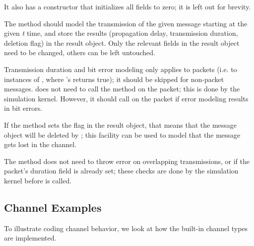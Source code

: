 It also has a constructor that initializes all fields to zero; it is left
out for brevity.

The method should model the transmission of the given message starting at
the given \textit{t} time, and store the results (propagation delay,
transmission duration, deletion flag) in the result object. Only the
relevant fields in the result object need to be changed, others can be left
untouched.

Transmission duration and bit error modeling only applies to packets (i.e.
to instances of , where 's
 returns true); it should be skipped for non-packet
messages.  does not need to call the 
method on the packet; this is done by the simulation kernel. However,
it should call  on the packet
if error modeling results in bit errors.

If the method sets the  flag in the result object, that
means that the message object will be deleted by {\opp}; this facility
can be used to model that the message gets lost in the channel.

The  method does not need to throw error on overlapping
transmissions, or if the packet's duration field is already set; these
checks are done by the simulation kernel before  is called.

%
%
%


\subsection{Channel Examples}

To illustrate coding channel behavior, we look at how the built-in channel
types are implemented.

